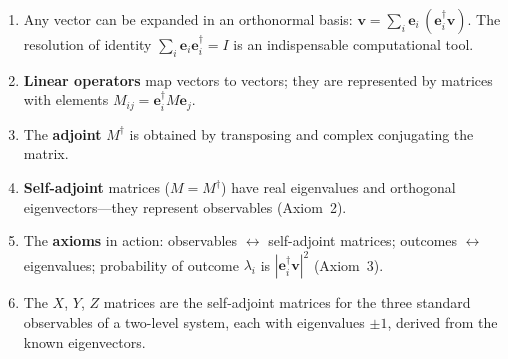 \documentclass[12pt,a4paper]{article}
\begin{document}
\begin{enumerate}[nosep]
    \item Any vector can be expanded in an orthonormal basis: $\mathbf{v}=\sum_i\mathbf{e}_i\,(\mathbf{e}_i^\dagger\mathbf{v})$.  The resolution of identity $\sum_i\mathbf{e}_i\mathbf{e}_i^\dagger=I$ is an indispensable computational tool.
    \item \textbf{Linear operators} map vectors to vectors; they are represented by matrices with elements $M_{ij}=\mathbf{e}_i^\dagger M\mathbf{e}_j$.
    \item The \textbf{adjoint} $M^\dagger$ is obtained by transposing and complex conjugating the matrix.
    \item \textbf{Self-adjoint} matrices ($M=M^\dagger$) have real eigenvalues and orthogonal eigenvectors---they represent observables (Axiom~2).
    \item The \textbf{axioms} in action: observables $\leftrightarrow$ self-adjoint matrices; outcomes $\leftrightarrow$ eigenvalues; probability of outcome $\lambda_i$ is $|\mathbf{e}_i^\dagger\mathbf{v}|^2$ (Axiom~3).
    \item The $X$, $Y$, $Z$ matrices are the self-adjoint matrices for the three standard observables of a two-level system, each with eigenvalues $\pm 1$, derived from the known eigenvectors.
\end{enumerate}
\end{document}
